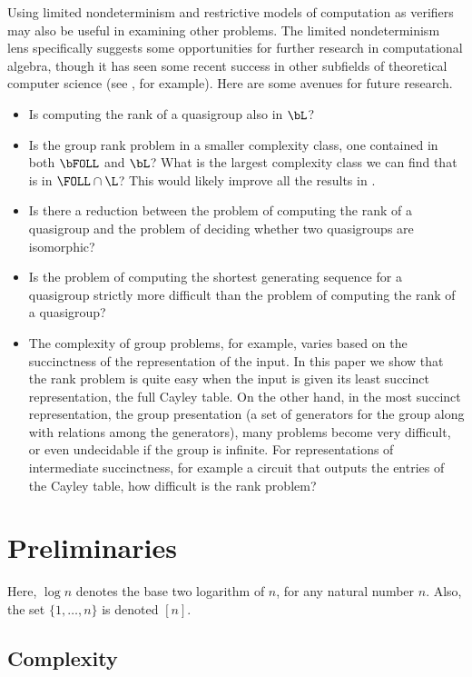 \documentclass{article}
\begin{document}
Using limited nondeterminism and restrictive models of computation as verifiers may also be useful in examining other problems.
The limited nondeterminism lens specifically suggests some opportunities for further research in computational algebra, though it has seen some recent success in other subfields of theoretical computer science (see \autocite{gottlob13}, for example).
Here are some avenues for future research.
\begin{itemize}
\item Is computing the rank of a quasigroup also in $\bL$?
\item
  Is the group rank problem in a smaller complexity class, one contained in both $\bFOLL$ and $\bL$?
  What is the largest complexity class we can find that is in $\FOLL \cap \L$?
  This would likely improve all the results in \autocite{bklm01}.
\item Is there a reduction between the problem of computing the rank of a quasigroup and the problem of deciding whether two quasigroups are isomorphic?
\item Is the problem of computing the shortest generating sequence for a quasigroup strictly more difficult than the problem of computing the rank of a quasigroup?
\item
  The complexity of group problems, for example, varies based on the succinctness of the representation of the input.
  In this paper we show that the rank problem is quite easy when the input is given its least succinct representation, the full Cayley table.
  On the other hand, in the most succinct representation, the group presentation (a set of generators for the group along with relations among the generators), many problems become very difficult, or even undecidable if the group is infinite.
  For representations of intermediate succinctness, for example a circuit that outputs the entries of the Cayley table, how difficult is the rank problem?
\end{itemize}


\section{Preliminaries}

Here, $\log n$ denotes the base two logarithm of $n$, for any natural number $n$.
Also, the set $\{1, \dotsc, n\}$ is denoted $[n]$.

\subsection{Complexity}
\end{document}
